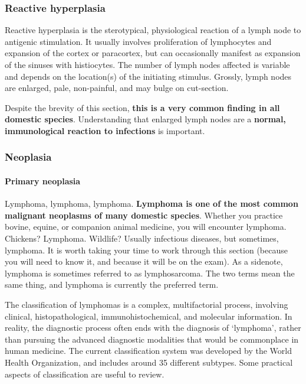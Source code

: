 \documentclass[openany]{article}
\let\oldparagraph\paragraph
\renewcommand{\paragraph}[1]{\oldparagraph{#1}\mbox{}}
\begin{document}
\hypertarget{reactive-hyperplasia}{\subsubsection{Reactive
hyperplasia}\label{reactive-hyperplasia}}

Reactive hyperplasia is the sterotypical, physiological reaction of a
lymph node to antigenic stimulation. It usually involves proliferation
of lymphocytes and expansion of the cortex or paracortex, but can
occasionally manifest as expansion of the sinuses with histiocytes. The
number of lymph nodes affected is variable and depends on the
location(s) of the initiating stimulus. Grossly, lymph nodes are
enlarged, pale, non-painful, and may bulge on cut-section.

Despite the brevity of this section, \textbf{this is a very common
finding in all domestic species}. Understanding that enlarged lymph
nodes are a \textbf{normal, immunological reaction to infections} is
important.

\hypertarget{neoplasia-1}{\subsubsection{Neoplasia}\label{neoplasia-1}}

\hypertarget{primary-neoplasia}{\paragraph{Primary
neoplasia}\label{primary-neoplasia}}

Lymphoma, lymphoma, lymphoma. \textbf{Lymphoma is one of the most common
malignant neoplasms of many domestic species}. Whether you practice
bovine, equine, or companion animal medicine, you will encounter
lymphoma. Chickens? Lymphoma. Wildlife? Usually infectious diseases, but
sometimes, lymphoma. It is worth taking your time to work through this
section (because you will need to know it, and because it will be on the
exam). As a sidenote, lymphoma is sometimes referred to as
lymphosarcoma. The two terms mean the same thing, and lymphoma is
currently the preferred term.

The classification of lymphomas is a complex, multifactorial process,
involving clinical, histopathological, immunohistochemical, and
molecular information. In reality, the diagnostic process often ends
with the diagnosis of `lymphoma', rather than pursuing the advanced
diagnostic modalities that would be commonplace in human medicine. The
current classification system was developed by the World Health
Organization, and includes around 35 different subtypes. Some practical
aspects of classification are useful to review.
\end{document}
